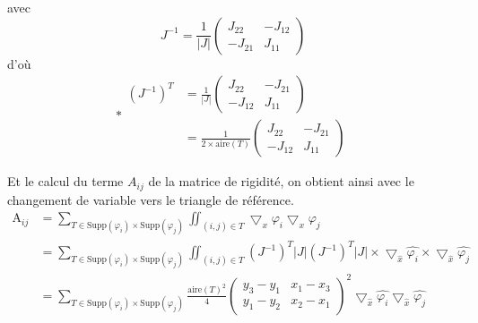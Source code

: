 \documentclass[a4paper,12pt,titlepage]{report}
\begin{document}
\begin{onehalfspace}
\begin{appendix}
avec
\[
J^{-1} =  \frac{1}{|J|}
\begin{pmatrix}
   J_{22} & -J_{12} \\
   -J_{21} & J_{11}
\end{pmatrix}
\]
d'où
\[
*\begin{aligned}
	(J^{-1})^{T} 
	&=  	
	\frac{1}{|J|}
	\begin{pmatrix}
   		J_{22} & -J_{21} \\
   		-J_{12} & J_{11}	
	\end{pmatrix} \\
	&=
	\frac{1}{2\times \text{aire}(T)}
	\begin{pmatrix}
   		J_{22} & -J_{21} \\
   		-J_{12} & J_{11}	
	\end{pmatrix} 
	\end{aligned}
\]

Et le calcul du terme $A_{ij}$ de la matrice de rigidité, on obtient ainsi avec le changement de variable vers le triangle de référence.
\[
\begin{aligned}
	\text{A}_{ij} 
	&=
	\sum_{T \in \text{Supp}(\varphi_{i})\times \text{Supp}(\varphi_{j})} 
	\iint_{(i,j) \in T}\bigtriangledown_{x}{\varphi_{i}} \bigtriangledown_{x}{\varphi_{j}} \\
	&=
	\sum_{T \in \text{Supp}(\varphi_{i})\times \text{Supp}(\varphi_{j})}
	\iint_{(i,j) \in T} (J^{-1})^{T}|J|(J^{-1})^{T}|J|
	\times
	\bigtriangledown_{\hat{x}} \hat{\varphi_{i}}
	\times
	\bigtriangledown_{\hat{x}} \hat{\varphi_{j}} \\
	&=
	\sum_{T \in \text{Supp}(\varphi_{i})\times \text{Supp}(\varphi_{j})}	
	\frac{\text{aire}(T)^{2}}{4}
	\begin{pmatrix}
   		y_{3}-y_{1} &  	x_{1}-x_{3}\\
   		y_{1}-y_{2} &  x_{2}-x_{1}
	\end{pmatrix}
	^{2}
	\bigtriangledown_{\hat{x}} \hat{\varphi_{i}}
	\bigtriangledown_{\hat{x}} \hat{\varphi_{j}}
\end{aligned}
\]

\iffalse

\end{appendix}
\end{onehalfspace}
\end{document}
